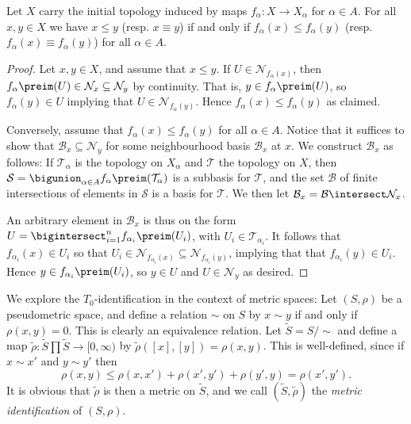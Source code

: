 \documentclass[article, a4paper, 11pt, oneside]{memoir}
\numberwithin{equation}{chapter}
\newcommand{\calT}{\mathcal{T}}
\newcommand{\calN}{\mathcal{N}}
\newcommand{\calB}{\mathcal{B}}
\newcommand{\calS}{\mathcal{S}}
\newcommand{\nhoodfilter}[1]{\calN_{#1}}
\begin{document}
\begin{proposition}
    \label{prop:specialisation-preorder-initial-topology}
    Let $X$ carry the initial topology induced by maps $f_\alpha \colon X \to X_\alpha$ for $\alpha \in A$. For all $x,y \in X$ we have $x \leq y$ (resp. $x \equiv y$) if and only if $f_\alpha(x) \leq f_\alpha(y)$ (resp. $f_\alpha(x) \equiv f_\alpha(y)$) for all $\alpha \in A$.
\end{proposition}

\begin{proof}
    Let $x,y \in X$, and assume that $x \leq y$. If $U \in \nhoodfilter{f_\alpha(x)}$, then $f_\alpha\preim(U) \in \nhoodfilter{x} \subseteq \nhoodfilter{y}$ by continuity. That is, $y \in f_\alpha\preim(U)$, so $f_\alpha(y) \in U$ implying that $U \in \nhoodfilter{f_\alpha(y)}$. Hence $f_\alpha(x) \leq f_\alpha(y)$ as claimed.

    Conversely, assume that $f_\alpha(x) \leq f_\alpha(y)$ for all $\alpha \in A$. Notice that it suffices to show that $\calB_x \subseteq \nhoodfilter{y}$ for some neighbourhood basis $\calB_x$ at $x$. We construct $\calB_x$ as follows: If $\calT_\alpha$ is the topology on $X_\alpha$ and $\calT$ the topology on $X$, then $\calS = \bigunion_{\alpha \in A} f_\alpha\preim(\calT_\alpha)$ is a subbasis for $\calT$, and the set $\calB$ of finite intersections of elements in $\calS$ is a basis for $\calT$. We then let $\calB_x = \calB \intersect \nhoodfilter{x}$.

    An arbitrary element in $\calB_x$ is thus on the form $U = \bigintersect_{i=1}^n f_{\alpha_i}\preim(U_i)$, with $U_i \in \calT_{\alpha_i}$. It follows that $f_{\alpha_i}(x) \in U_i$ so that $U_i \in \nhoodfilter{f_{\alpha_i}(x)} \subseteq \nhoodfilter{f_{\alpha_i}(y)}$, implying that that $f_{\alpha_i}(y) \in U_i$. Hence $y \in f_{\alpha_i}\preim(U_i)$, so $y \in U$ and $U \in \nhoodfilter{y}$ as desired.
\end{proof}


We explore the $T_0$-identification in the context of metric spaces: Let $(S,\rho)$ be a pseudometric space, and define a relation $\sim$ on $S$ by $x \sim y$ if and only if $\rho(x,y) = 0$. This is clearly an equivalence relation. Let $\tilde{S} = S/{\sim}$ and define a map $\tilde{\rho} \colon \tilde{S} \prod \tilde{S} \to [0,\infty)$ by $\tilde{\rho}([x],[y]) = \rho(x,y)$. This is well-defined, since if $x \sim x'$ and $y \sim y'$ then
%
\begin{equation*}
    \rho(x,y)
        \leq \rho(x,x') + \rho(x',y') + \rho(y',y)
        = \rho(x',y').
\end{equation*}
%
It is obvious that $\tilde{\rho}$ is then a metric on $\tilde{S}$, and we call $(\tilde{S}, \tilde{\rho})$ the \emph{metric identification} of $(S,\rho)$.
\end{document}
